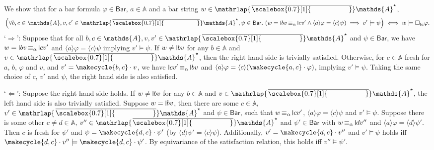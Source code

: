 \documentclass[10pt,a4paper]{amsart}
\theoremstyle{definition}
\newcommand{\At}{\mathds{A}}
\newcommand{\barAs}{\barNames^{\star}}
\newcommand{\names}{\At}
\newcommand{\braket}[1]{\langle #1 \rangle}
\DeclareMathOperator{\alphaequiv}{\equiv_{\alpha}}
\newcommand{\mybar}[3]{%
  \mathrlap{\hspace{#2}\overline{\scalebox{#1}[1]{\phantom{\ensuremath{#3}}}}}\ensuremath{#3}
}
\newcommand{\BarForm}{\mathsf{Bar}}
\newcommand{\barNames}{{\mybar{0.7}{1.25pt}{\names}}}
\renewcommand{\vDash}{\models}
\newcommand{\midmid}{\hspace{0.2ex}{\rule[-0.1ex]{0.6pt}{1.65ex}}\hspace{0.2ex}}
\newcommand{\scriptmidmid}{\hspace{0.2ex}{\rule[-0.1ex]{0.6pt}{1.1ex}}\hspace{0.2ex}}
\newcommand{\newletter}[1]{{\midmid}#1}
\newcommand{\scriptnew}[1]{{\scriptmidmid}#1}
\let\originalleft\left
\let\originalright\right
\renewcommand{\left}{\mathopen{}\mathclose\bgroup\originalleft}
\renewcommand{\right}{\aftergroup\egroup\originalright}
\renewcommand{\enquote}[1]{`#1'}
\begin{document}
\begin{IEEEproof}
  We show that for a bar formula $\varphi \in \BarForm$, $a \in \names$ and
  a bar string $w \in \barAs$,
  \[ 
    \left(\forall b, c \in \names, v, c' \in \barAs, \psi \in \BarForm.\ \left(w = \newletter{b}v \alphaequiv \newletter{c}v' \wedge \braket{a}\varphi = \braket{c}\psi\right) \implies v' \vDash \psi\right) \iff w \vDash \Box_{\scriptnew{a}} \varphi.
  \]
  \enquote{$\Rightarrow$}: Suppose that for all $b, c \in \names, v, v' \in \barAs$ and $\psi \in \BarForm$, we have
  $w = \newletter{b}v \alphaequiv \newletter{c}v'$ and $\braket{a}\varphi = \braket{c}\psi$
  implying $v' \vDash \psi$. If $w \neq \newletter{b}v$ for any $b \in \names$ and $v \in \barAs$, then the right hand
  side is trivially satisfied. Otherwise, for $c \in \names$ fresh for $a$, $b$, $\varphi$ and $v$, and
  $v' = \makecycle{b,c} \cdot v$, we have $\newletter{c}v' \alphaequiv \newletter{b}v$ and $\braket{a}\varphi =
  \braket{c}\left(\makecycle{a,c} \cdot \varphi\right)$, implying $v' \vDash \psi$. Taking the same choice of
  $c$, $v'$ and $\psi$, the right hand side is also satisfied.

  \noindent\enquote{$\Leftarrow$}: Suppose the right hand side holds. If $w \neq \newletter{b}v$ for any $b \in \names$
  and $v \in \barAs$, the left hand side is also trivially satisfied. Suppose $w = \newletter{b}v$, then
  there are some $c \in \names$, $v' \in \barAs$ and $\psi \in \BarForm$, such that $w \alphaequiv \newletter{c}v'$,
  $\braket{a}\varphi = \braket{c}\psi$ and $v' \vDash \psi$. Suppose there is some other $c \neq d \in \names$,
  $v'' \in \barAs$ and $\psi' \in \BarForm$ with $w \alphaequiv \newletter{d}v''$ and $\braket{a}\varphi =
  \braket{d}\psi'$.
  Then $c$ is fresh for $\psi'$ and $\psi = \makecycle{d,c} \cdot \psi'$ (by $\braket{d}\psi' = \braket{c}\psi$). 
  Additionally, $v' = \makecycle{d,c} \cdot v''$ and $v' \vDash \psi$ holds iff $\makecycle{d,c}\cdot v'' \vDash
  \makecycle{d,c} \cdot \psi'$. By equivariance of the satisfaction relation, this holds iff $v'' \vDash \psi'$.
\end{IEEEproof}
\end{document}
